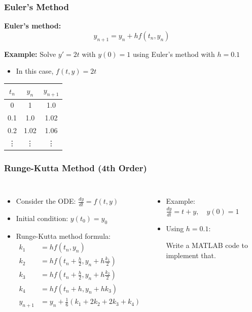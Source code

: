 \documentclass[aspectratio=169,xcolor=dvipsnames,svgnames,x11names,fleqn]{beamer}
\begin{document}
\begin{frame}
  \frametitle{Euler's Method}
  \textbf{Euler's method:}
  \begin{equation*}
    y_{n+1} = y_n + hf(t_n, y_n)
  \end{equation*}
  
  \textbf{Example:} Solve $y' = 2t$ with $y(0) = 1$ using Euler's method with $h = 0.1$
  \begin{itemize}
    \item In this case, $f(t, y) = 2t$
  \end{itemize}
  \begin{table}
    \begin{tabular}{c|c|c}
      $t_n$ & $y_n$ & $y_{n+1}$ \\
      \hline
      0 & 1 & 1.0 \\
      0.1 & 1.0 & 1.02 \\
      0.2 & 1.02 & 1.06 \\
      \vdots & \vdots & \vdots
    \end{tabular}
  \end{table}
\end{frame}

\begin{frame}
\frametitle{Runge-Kutta Method (4th Order)}
\begin{columns}
    \begin{itemize}
          \item Consider the ODE: $ \frac{dy}{dt} = f(t, y) $
    \item Initial condition: $ y(t_0) = y_0 $
    \item Runge-Kutta method formula:
    $$
    \begin{aligned}
    k_1 &= h f(t_n, y_n) \\
    k_2 &= h f\left(t_n + \frac{h}{2}, y_n + h \frac{k_1}{2}\right) \\
    k_3 &= h f\left(t_n + \frac{h}{2}, y_n + h \frac{k_2}{2}\right) \\
    k_4 &= h f(t_n + h, y_n + h k_3) \\
    y_{n+1} &= y_n + \frac{1}{6}(k_1 + 2k_2 + 2k_3 + k_4)
    \end{aligned}
    $$
    \end{itemize}

\begin{itemize}
  
    \item Example: $ \frac{dy}{dt} = t + y, \quad y(0) = 1 $
    \item Using $ h = 0.1 $:
   
    Write a MATLAB code to implement that.
\end{itemize}
\end{columns}
\end{frame}
\end{document}
